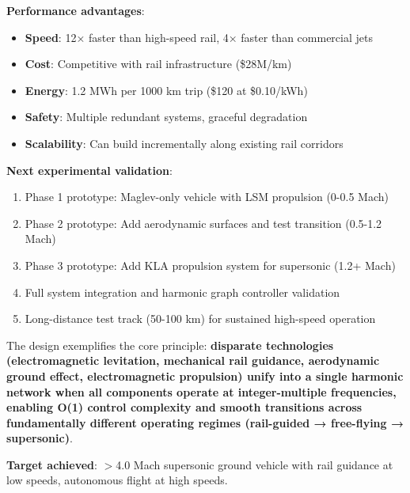 \documentclass[12pt,a4paper]{article}
\begin{document}
\textbf{Performance advantages}:
\begin{itemize}
\item \textbf{Speed}: 12× faster than high-speed rail, 4× faster than commercial jets
\item \textbf{Cost}: Competitive with rail infrastructure (\$28M/km)
\item \textbf{Energy}: 1.2 MWh per 1000 km trip (\$120 at \$0.10/kWh)
\item \textbf{Safety}: Multiple redundant systems, graceful degradation
\item \textbf{Scalability}: Can build incrementally along existing rail corridors
\end{itemize}

\textbf{Next experimental validation}:
\begin{enumerate}
\item Phase 1 prototype: Maglev-only vehicle with LSM propulsion (0-0.5 Mach)
\item Phase 2 prototype: Add aerodynamic surfaces and test transition (0.5-1.2 Mach)
\item Phase 3 prototype: Add KLA propulsion system for supersonic (1.2+ Mach)
\item Full system integration and harmonic graph controller validation
\item Long-distance test track (50-100 km) for sustained high-speed operation
\end{enumerate}

The design exemplifies the core principle: \textbf{disparate technologies (electromagnetic levitation, mechanical rail guidance, aerodynamic ground effect, electromagnetic propulsion) unify into a single harmonic network when all components operate at integer-multiple frequencies, enabling O(1) control complexity and smooth transitions across fundamentally different operating regimes (rail-guided → free-flying → supersonic)}.

\textbf{Target achieved}: $>$4.0 Mach supersonic ground vehicle with rail guidance at low speeds, autonomous flight at high speeds.
\end{document}

